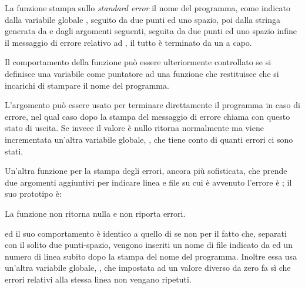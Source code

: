 La funzione stampa sullo \textit{standard error} il nome del programma, come
indicato dalla variabile globale , seguito da due punti ed
uno spazio, poi dalla stringa generata da  e dagli argomenti
seguenti, seguita da due punti ed uno spazio infine il messaggio di errore
relativo ad , il tutto è terminato da un a capo.

Il comportamento della funzione può essere ulteriormente controllato se si
definisce una variabile  come puntatore ad una
funzione  che restituisce  che si incarichi di stampare
il nome del programma. 

L'argomento  può essere usato per terminare direttamente il
programma in caso di errore, nel qual caso  dopo la stampa del
messaggio di errore chiama  con questo stato di uscita. Se invece
il valore è nullo  ritorna normalmente ma viene incrementata
un'altra variabile globale, , che tiene conto di
quanti errori ci sono stati.

Un'altra funzione per la stampa degli errori, ancora più sofisticata, che
prende due argomenti aggiuntivi per indicare linea e file su cui è avvenuto
l'errore è ; il suo prototipo è:

\begin{funcproto}{
}

{La funzione non ritorna nulla e non riporta errori.}  
\end{funcproto}

\noindent ed il suo comportamento è identico a quello di  se non
per il fatto che, separati con il solito due punti-spazio, vengono inseriti un
nome di file indicato da  ed un numero di linea subito dopo la
stampa del nome del programma. Inoltre essa usa un'altra variabile globale,
, che impostata ad un valore diverso da zero fa sì
che errori relativi alla stessa linea non vengano ripetuti.


